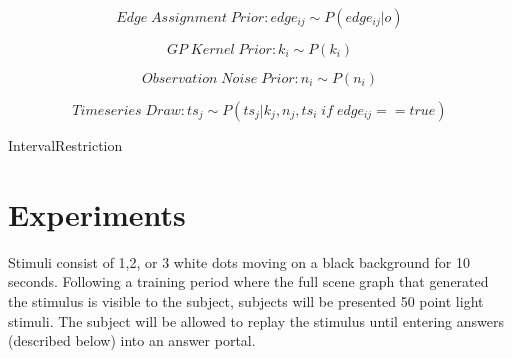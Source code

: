 \documentclass{scrartcl}
\begin{document}
\begin{equation}
  Edge \; Assignment \; Prior: edge_{ij} \sim P(edge_{ij} | o)
\end{equation}

\begin{equation}
  GP \; Kernel \; Prior: k_i \sim P(k_i)
\end{equation}

\begin{equation}
  Observation \; Noise \; Prior: n_i \sim P(n_i)
\end{equation}

\begin{equation}
  Timeseries \; Draw: ts_j \sim P(ts_j | k_j, n_j, ts_i \; if \; edge_{ij} == true)
\end{equation}


\begin{algorithm}
\DontPrintSemicolon
{} 
\caption{IntervalRestriction\label{IR}}
\end{algorithm}  





\section{Experiments}

Stimuli consist of 1,2, or 3 white dots moving on a black background for 10 seconds. Following a training period where the full scene graph that generated the stimulus is visible to the subject, subjects will be presented 50 point light stimuli. The subject will be allowed to replay the stimulus until entering answers (described below) into an answer portal. 
\end{document}
